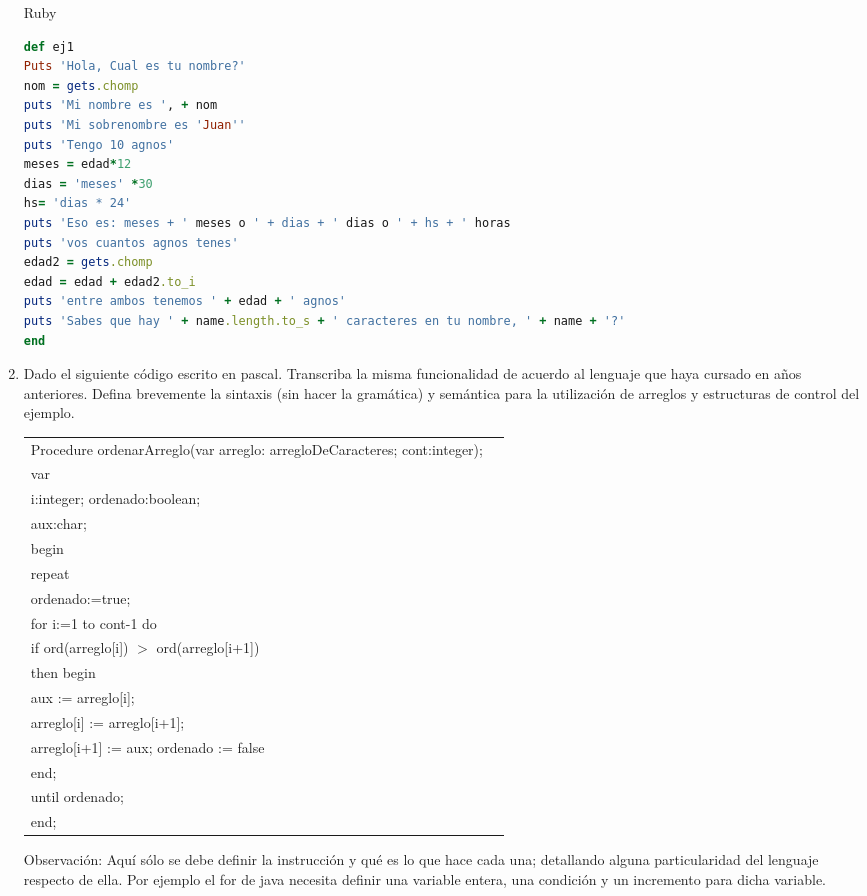 \documentclass[a4paper,10pt]{article}
\begin{document}
\begin{enumerate}
\subitem Ruby
\begin{lstlisting}[language=Ruby]
def ej1
Puts 'Hola, Cual es tu nombre?'
nom = gets.chomp
puts 'Mi nombre es ', + nom
puts 'Mi sobrenombre es 'Juan''
puts 'Tengo 10 agnos'
meses = edad*12
dias = 'meses' *30
hs= 'dias * 24'
puts 'Eso es: meses + ' meses o ' + dias + ' dias o ' + hs + ' horas
puts 'vos cuantos agnos tenes'
edad2 = gets.chomp
edad = edad + edad2.to_i
puts 'entre ambos tenemos ' + edad + ' agnos'
puts 'Sabes que hay ' + name.length.to_s + ' caracteres en tu nombre, ' + name + '?'
end
\end{lstlisting}

\item Dado el siguiente código escrito en pascal. Transcriba la misma funcionalidad de acuerdo al lenguaje que haya cursado en años anteriores. Defina brevemente la sintaxis (sin hacer la gramática) y semántica para la utilización de arreglos y estructuras de control del ejemplo.

\begin{tabular}{p{6cm}|p{7cm}}
Procedure ordenarArreglo(var arreglo: arregloDeCaracteres; cont:integer); & \\
var & \\
i:integer; ordenado:boolean; & \\
aux:char; & \\
begin & \\
repeat & \\
ordenado:=true; & \\
for i:=1 to cont-1 do & \\
if ord(arreglo[i]) $>$ ord(arreglo[i+1]) & \\
then begin & \\
aux := arreglo[i]; & \\
arreglo[i] := arreglo[i+1]; & \\
arreglo[i+1] := aux; ordenado := false & \\
end; & \\
until ordenado; & \\
end; & \\

\end{tabular}
\hspace{1cm}
Observación: Aquí sólo se debe definir la instrucción y qué es lo que hace cada una; detallando alguna particularidad del lenguaje respecto de ella. Por ejemplo el for de java necesita definir una variable entera, una condición y un incremento para dicha variable.

\newpage


\end{enumerate}
\end{document}
